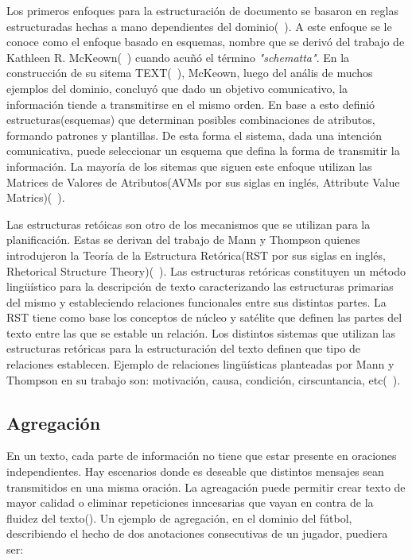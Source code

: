     Los primeros enfoques para la estructuración de documento se basaron en reglas estructuradas hechas a mano dependientes del dominio(~\cite{Gatt2018SurveyOT}). A este enfoque se le conoce como el enfoque basado en esquemas, nombre que 
se deriv\'o del trabajo de Kathleen R. McKeown(~\cite{mckeown1985discourse}) cuando acu\~n\'o el t\'ermino \textit{"schematta"}. En la construcci\'on de su sitema TEXT(~\cite{mckeown1985discourse}), McKeown, luego del an\'alis de muchos 
ejemplos del dominio, concluyó que dado un objetivo comunicativo, la información tiende a transmitirse en el mismo orden. En base a esto defini\'o estructuras(esquemas) que determinan posibles combinaciones de atributos, formando patrones 
y plantillas. De esta forma el sistema, dada una intenci\'on comunicativa, puede seleccionar un esquema que defina la forma de transmitir la información. La mayor\'ia de los sitemas que siguen este enfoque utilizan 
las Matrices de Valores de Atributos(AVMs por sus siglas en inglés, Attribute Value Matrics)(~\cite{Perera2017RecentAI}).

    Las estructuras ret\'oicas son otro de los mecanismos que se utilizan para la planificación. Estas se derivan del trabajo de Mann y Thompson quienes introdujeron la Teor\'ia de la Estructura Ret\'orica(RST por
sus siglas en inglés, Rhetorical Structure Theory)(~\cite{mann1988rhetorical}). Las estructuras ret\'oricas constituyen un m\'etodo lingüístico para la descripci\'on de texto caracterizando las estructuras primarias del mismo y estableciendo 
relaciones funcionales entre sus distintas partes. La RST tiene como base los conceptos de n\'ucleo y sat\'elite que definen las partes del texto entre las que se estable un relaci\'on. Los distintos sistemas que utilizan las estructuras ret\'oricas 
para la estructuraci\'on del texto definen que tipo de relaciones establecen. Ejemplo de relaciones lingüísticas planteadas por Mann y Thompson en su trabajo son: motivaci\'on, causa, condici\'on, cirscuntancia, etc(~\cite{mann1988rhetorical}). 

\subsection{Agregación}

    En un texto, cada parte de información no tiene que estar presente en oraciones independientes. Hay escenarios donde es 
deseable que distintos mensajes sean transmitidos en una misma oraci\'on. La agreagaci\'on puede permitir crear texto de mayor 
calidad o eliminar repeticiones inncesarias que vayan en contra de la fluidez del texto(\cite{Gatt2018SurveyOT}).
    Un ejemplo de agregaci\'on, en el dominio del f\'utbol, describiendo el hecho de dos anotaciones consecutivas de un jugador, puediera ser:

